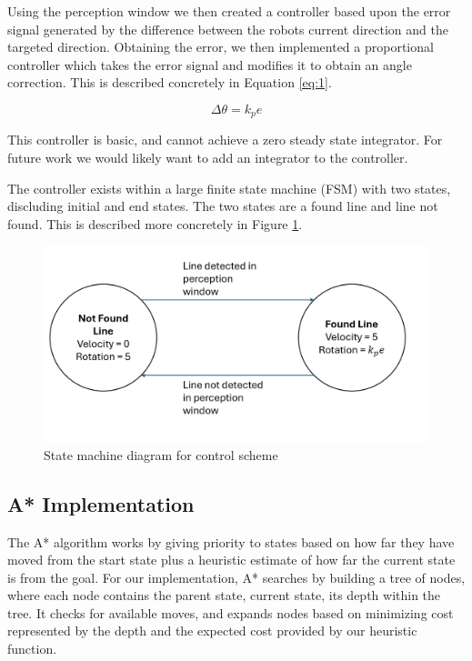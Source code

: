 \documentclass[11pt]{article}
\begin{document}
    Using the perception window we then created a controller based upon the
    error signal generated by the difference between the robots current
    direction and the targeted direction. Obtaining the error, we then
    implemented a proportional controller which takes the error signal and
    modifies it to obtain an angle correction. This is described concretely in
    Equation  \ref{eq:1}.

    \begin{equation} \label{eq:1}
        \Delta \theta = k_p e
    \end{equation}

    This controller is basic, and cannot achieve a zero steady state integrator. For future work we would likely want to add an integrator to the controller. 

    The controller exists within a large finite state machine (FSM) with two
    states, discluding initial and end states. The two states are a found line
    and line not found. This is described more concretely in Figure \ref{fig:state_machine}.
    
    \begin{figure}[ht]
        \centering
        \includegraphics[scale=0.2]{figures/state_machine.png}
        \caption{State machine diagram for control scheme}
        \label{fig:state_machine}
    \end{figure}

    \subsection{A* Implementation}

    The A* algorithm works by giving priority to states based on how far they have moved from the start state plus a heuristic estimate of how far the current state is from the goal. For our implementation, A* searches by building a tree of nodes, where each node contains the parent state, current state, its depth within the tree. It checks for available moves, and expands nodes based on minimizing cost represented by the depth and the expected cost provided by our heuristic function. 
\end{document}
